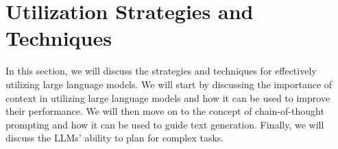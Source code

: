 
\section{Utilization Strategies and Techniques}
\label{ch:utilization}

\label{sec:ch3-introduction}

In this section, we will discuss the strategies and techniques for effectively utilizing large language models.
We will start by discussing the importance of context in utilizing large language models and how it can be used to improve their performance.
We will then move on to the concept of chain-of-thought prompting and how it can be used to guide text generation.
Finally, we will discuss the LLMs' ability to plan for complex tasks.

